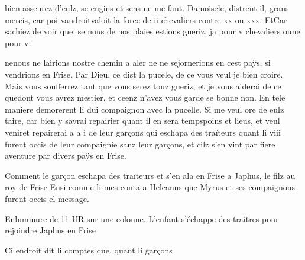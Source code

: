 \documentclass{article}
\begin{document}
\begin{pages}
                     bien asseurez d’eulz, se engins et sens ne me faut.
               Damoisele, distrent il, grans mercis, car poi 
                     vaudroitvaloit la force de ii chevaliers contre xx ou
                  xxx. 
                     EtCar sachiez de voir que, se nous de nos plaies estions gueriz, ja pour
                     v chevaliers 
                     oune pour vi
                  
                     nenous ne lairions nostre chemin a aler ne ne sejornerions en cest paÿs, si vendrions
                  en Frise.
               Par Dieu, 
                     ce dist la pucele,
                      de ce vous veul je bien croire. Mais vous soufferrez tant que vous serez 
                     touz
                  gueriz, et je vous aiderai de ce 
                     quedont vous avrez mestier, et ceenz n’avez vous garde 
                     se bonne non. En tele maniere demorerent 
                  li dui compaignon avec la pucelle. Si me
                  veul ore de eulz taire, 
                     car bien y savrai repairier quant il en sera 
                           tempspoins et lieus, et veul veniret repairerai a a i de leur
                     garçons qui eschapa des traïteurs quant li viii furent occis 
                     de leur compaignie sanz leur garçons, et cilz s’en vint par fiere aventure par divers paÿs en Frise. \pend
         
         
            
                  Comment le
                        garçon eschapa des traïteurs et s’en ala en Frise a Japhus, 
                        le filz au roy de
                                 Frise
                  Ensi comme li mes conta a Helcanus que Myrus et ses compaignons
                     furent occis el message.
            
               
               Enluminure de 11 UR sur une colonne. L’enfant s’échappe des traitres pour
                  rejoindre Japhus en Frise
            
            \pstart Ci endroit dit li comptes
               que, quant li garçons
               

\end{pages}
\end{document}
